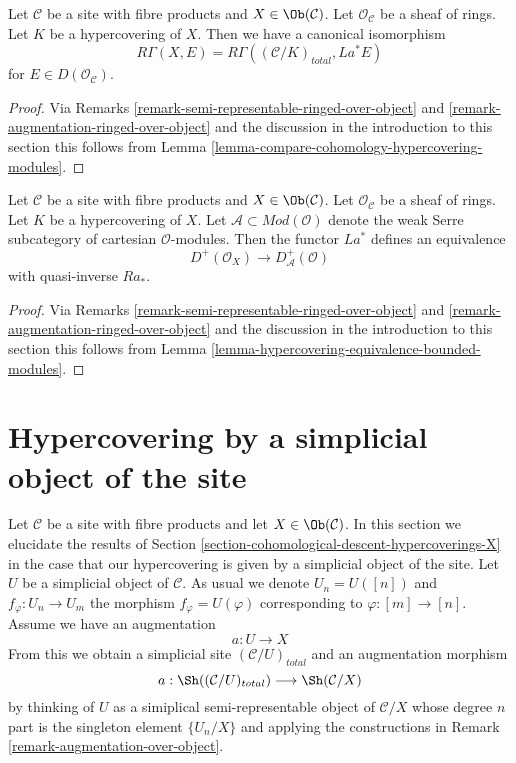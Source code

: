 \begin{lemma}
\label{lemma-compare-cohomology-hypercovering-X-modules}
Let $\mathcal{C}$ be a site with fibre products and $X \in \Ob(\mathcal{C})$.
Let $\mathcal{O}_\mathcal{C}$ be a sheaf of rings.
Let $K$ be a hypercovering of $X$.
Then we have a canonical isomorphism
$$
R\Gamma(X, E) = R\Gamma((\mathcal{C}/K)_{total}, La^*E)
$$
for $E \in D(\mathcal{O}_\mathcal{C})$.
\end{lemma}

\begin{proof}
Via Remarks \ref{remark-semi-representable-ringed-over-object} and
\ref{remark-augmentation-ringed-over-object} and the discussion in
the introduction to this section
this follows from Lemma \ref{lemma-compare-cohomology-hypercovering-modules}.
\end{proof}

\begin{lemma}
\label{lemma-hypercovering-X-equivalence-bounded-modules}
Let $\mathcal{C}$ be a site with fibre products and $X \in \Ob(\mathcal{C})$.
Let $\mathcal{O}_\mathcal{C}$ be a sheaf of rings.
Let $K$ be a hypercovering of $X$.
Let $\mathcal{A} \subset \textit{Mod}(\mathcal{O})$
denote the weak Serre subcategory of cartesian $\mathcal{O}$-modules.
Then the functor $La^*$ defines an equivalence
$$
D^+(\mathcal{O}_X) \longrightarrow D_\mathcal{A}^+(\mathcal{O})
$$
with quasi-inverse $Ra_*$.
\end{lemma}

\begin{proof}
Via Remarks \ref{remark-semi-representable-ringed-over-object} and
\ref{remark-augmentation-ringed-over-object} and the discussion in
the introduction to this section
this follows from Lemma \ref{lemma-hypercovering-equivalence-bounded-modules}.
\end{proof}










\section{Hypercovering by a simplicial object of the site}
\label{section-hypercovering}

\noindent
Let $\mathcal{C}$ be a site with fibre products and
let $X \in \Ob(\mathcal{C})$.
In this section we elucidate the results of
Section \ref{section-cohomological-descent-hypercoverings-X}
in the case that our hypercovering is given by
a simplicial object of the site.
Let $U$ be a simplicial object of $\mathcal{C}$.
As usual we denote $U_n = U([n])$ and $f_\varphi : U_n \to U_m$
the morphism $f_\varphi = U(\varphi)$ corresponding to
$\varphi : [m] \to [n]$.
Assume we have an augmentation
$$
a : U \to X
$$
From this we obtain a simplicial site $(\mathcal{C}/U)_{total}$
and an augmentation morphism
$$
a : \Sh((\mathcal{C}/U)_{total}) \longrightarrow \Sh(\mathcal{C}/X)
$$
by thinking of $U$ as a simiplical semi-representable
object of $\mathcal{C}/X$ whose degree $n$ part is the singleton
element $\{U_n/X\}$ and applying the constructions in
Remark \ref{remark-augmentation-over-object}.

